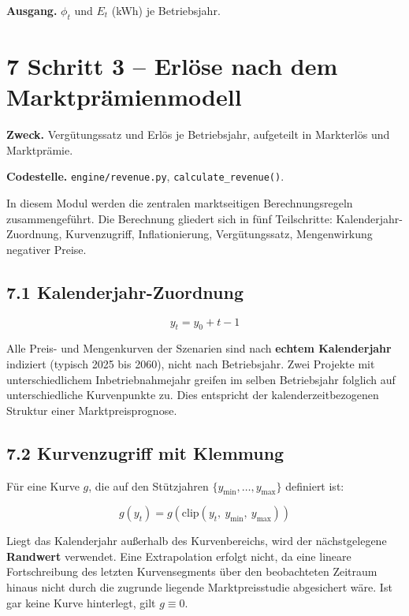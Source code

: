 \documentclass[
  a4paper,
  10pt]{article}
\begin{document}
\textbf{Ausgang.} \(\phi_t\) und \(E_t\) (kWh) je Betriebsjahr.

\hypertarget{schritt-3-erluxf6se-nach-dem-marktpruxe4mienmodell}{%
\section{7 Schritt 3 -- Erlöse nach dem
Marktprämienmodell}\label{schritt-3-erluxf6se-nach-dem-marktpruxe4mienmodell}}

\textbf{Zweck.} Vergütungssatz und Erlös je Betriebsjahr, aufgeteilt in
Markterlös und Marktprämie.

\textbf{Codestelle.} \nolinkurl{engine/revenue.py},
\texttt{calculate\_revenue()}.

In diesem Modul werden die zentralen marktseitigen Berechnungsregeln
zusammengeführt. Die Berechnung gliedert sich in fünf Teilschritte:
Kalenderjahr-Zuordnung, Kurvenzugriff, Inflationierung, Vergütungssatz,
Mengenwirkung negativer Preise.

\hypertarget{kalenderjahr-zuordnung}{%
\subsection{7.1 Kalenderjahr-Zuordnung}\label{kalenderjahr-zuordnung}}

\[ y_t = y_0 + t - 1 \]

Alle Preis- und Mengenkurven der Szenarien sind nach \textbf{echtem
Kalenderjahr} indiziert (typisch 2025 bis 2060), nicht nach
Betriebsjahr. Zwei Projekte mit unterschiedlichem Inbetriebnahmejahr
greifen im selben Betriebsjahr folglich auf unterschiedliche
Kurvenpunkte zu. Dies entspricht der kalenderzeitbezogenen Struktur
einer Marktpreisprognose.

\hypertarget{kurvenzugriff-mit-klemmung}{%
\subsection{7.2 Kurvenzugriff mit
Klemmung}\label{kurvenzugriff-mit-klemmung}}

Für eine Kurve \(g\), die auf den Stützjahren
\(\{y_{\min}, \dots, y_{\max}\}\) definiert ist:

\[ g(y_t) = g\left(\mathrm{clip}(y_t,\ y_{\min},\ y_{\max})\right) \]

Liegt das Kalenderjahr außerhalb des Kurvenbereichs, wird der
nächstgelegene \textbf{Randwert} verwendet. Eine Extrapolation erfolgt
nicht, da eine lineare Fortschreibung des letzten Kurvensegments über
den beobachteten Zeitraum hinaus nicht durch die zugrunde liegende
Marktpreisstudie abgesichert wäre. Ist gar keine Kurve hinterlegt, gilt
\(g \equiv 0\).
\end{document}
